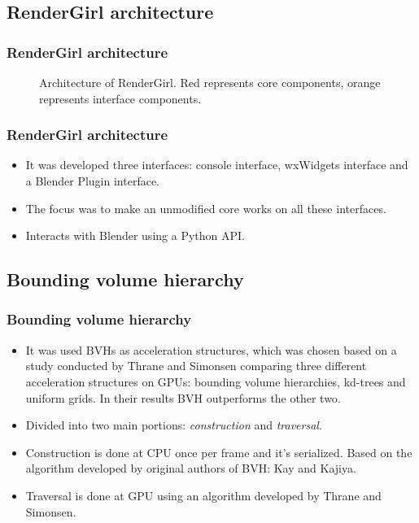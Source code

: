 \documentclass{beamer}
\begin{document}
\subsection{RenderGirl architecture}
\begin{frame}
\frametitle{RenderGirl architecture}

\begin{figure}
\centering

\caption{Architecture of RenderGirl. Red represents core components,
  orange represents interface components.}
\label{fig:architecture}
\end{figure}

\end{frame}


\begin{frame}
\frametitle{RenderGirl architecture}
\begin{itemize}
\item It was developed three interfaces: console interface, wxWidgets
  interface and a Blender Plugin interface.
\item The focus was to make an unmodified core works on all these
  interfaces.
\item Interacts with Blender using a Python API.
\end{itemize}
\end{frame}


\subsection{Bounding volume hierarchy}
\begin{frame}
  \frametitle{Bounding volume hierarchy}
\begin{itemize}
\item It was used BVHs as acceleration structures, which was chosen
  based on a study conducted by Thrane and Simonsen comparing three
  different acceleration structures on GPUs: bounding volume
  hierarchies, kd-trees and uniform grids. In their results BVH
  outperforms the other
  two\cite{Thrane}. %
\item Divided into two main portions: \emph{construction} and \emph{traversal}.
\item Construction is done at CPU once per frame and it's
  serialized. Based on the algorithm developed by original authors of
  BVH: Kay and Kajiya\cite{kay1986ray}.
\item Traversal is done at GPU using an algorithm developed by Thrane
  and Simonsen.
\end{itemize}

\end{frame}
\end{document}
